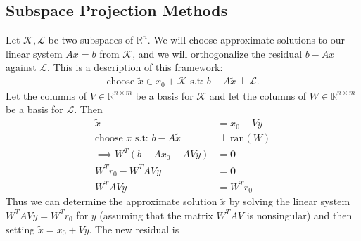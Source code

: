 \documentclass[]{article}
\theoremstyle{definition}
\begin{document}
    \subsection{Subspace Projection Methods}\label{sec:Subspace_Projection_Methods}
        Let $\mathcal K, \mathcal L$ be two subspaces of $\mathbb{R}^n$. We will choose approximate solutions to our linear system $Ax=b$ from $\mathcal{K}$, and we will orthogonalize the residual $b-A \tilde{x}$ against $\mathcal{L}$.
        This is a description of this framework: 
        \begin{align}
            \text{choose }\tilde{x} \in x_0 + \mathcal{K} \text{ s.t: } b - A\tilde{x} \perp \mathcal{L} .
        \end{align}
        Let the columns of $V \in \mathbb{R}^{n \times m}$ be a basis for $\mathcal{K}$ and let the columns of $W \in \mathbb{R}^{n \times m}$ be a basis for $\mathcal{L}$.  Then
        \begin{align}
            \tilde{x} &= x_0 + Vy
            \\
            \text{choose } x \text{ s.t: } b - A\tilde{x}  &\perp \text{ran}(W)
            \\
            \implies W^T(b - Ax_0 - AVy) &= \mathbf{0}
            \\
            W^Tr_0 - W^TAVy&= \mathbf{0}
            \\
            W^TAVy &= W^Tr_0
        \end{align}
        Thus we can determine the approximate solution $\tilde{x}$ by solving the linear system $W^T A V y = W^T r_0$ for $y$ (assuming that the matrix $W^T A V$ is nonsingular) and then setting $\tilde{x} = x_0 + V y$.  The new residual is
\end{document}

